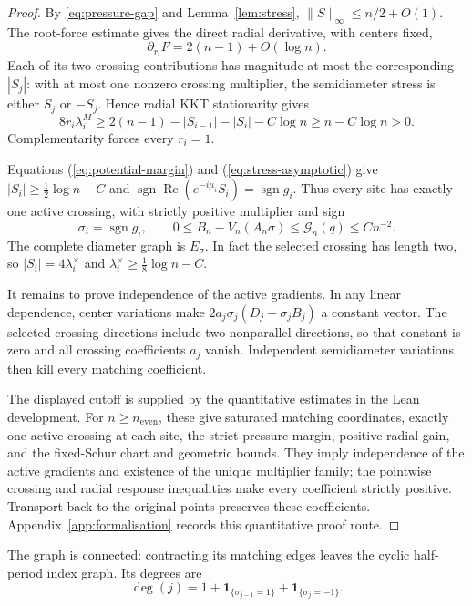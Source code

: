 \documentclass[11pt,reqno]{amsart}
\numberwithin{equation}{section}
\theoremstyle{definition}
\theoremstyle{remark}
\newcommand{\norm}[1]{\lVert #1\rVert}
\newcommand{\ind}{\mathbf 1}
\DeclareMathOperator{\sgn}{sgn}
\newcommand{\Rea}{\operatorname{Re}}
\begin{document}
\begin{proof}
By \eqref{eq:pressure-gap} and Lemma~\ref{lem:stress}, $\norm S_\infty\le n/2+O(1)$. The root-force estimate gives the direct radial derivative, with centers fixed,
\[
 \partial_{r_i}F=2(n-1)+O(\log n).
\]
Each of its two crossing contributions has magnitude at most the corresponding $|S_j|$: with at most one nonzero crossing multiplier, the semidiameter stress is either $S_j$ or $-S_j$. Hence radial KKT stationarity gives
\begin{equation}\label{eq:radial-stress}
 8r_i\lambda_i^M\ge 2(n-1)-|S_{i-1}|-|S_i|-C\log n
 \ge n-C\log n>0.
\end{equation}
Complementarity forces every $r_i=1$.

Equations (\ref{eq:potential-margin}) and (\ref{eq:stress-asymptotic}) give $|S_i|\ge\tfrac12\log n-C$ and
$\sgn\Rea(e^{-i\mu_i}S_i)=\sgn g_i$. Thus every site has exactly one active crossing, with strictly positive multiplier and sign
\begin{equation}\label{eq:model-deficit}
 \sigma_i=\sgn g_i,\qquad
 0\le B_n-V_n(A_n\sigma)\le\mathscr G_n(q)\le Cn^{-2}.
\end{equation}
The complete diameter graph is $E_\sigma$. In fact the selected crossing has length two, so $|S_i|=4\lambda_i^\times$ and $\lambda_i^\times\ge\tfrac18\log n-C$.

It remains to prove independence of the active gradients. In any linear dependence, center variations make $2a_j\sigma_j(D_j+\sigma_jB_j)$ a constant vector. The selected crossing directions include two nonparallel directions, so that constant is zero and all crossing coefficients $a_j$ vanish. Independent semidiameter variations then kill every matching coefficient.

The displayed cutoff is supplied by the quantitative estimates in the Lean development. For $n\ge n_{\mathrm{even}}$, these give saturated matching coordinates, exactly one active crossing at each site, the strict pressure margin, positive radial gain, and the fixed-Schur chart and geometric bounds. They imply independence of the active gradients and existence of the unique multiplier family; the pointwise crossing and radial response inequalities make every coefficient strictly positive. Transport back to the original points preserves these coefficients. Appendix~\ref{app:formalisation} records this quantitative proof route.

\end{proof}

The graph is connected: contracting its matching edges leaves the cyclic half-period index graph. Its degrees are
\begin{equation}\label{eq:degree}
 \deg(j)=1+\ind_{\{\sigma_{j-1}=1\}}+\ind_{\{\sigma_j=-1\}}.
\end{equation}
\end{document}
